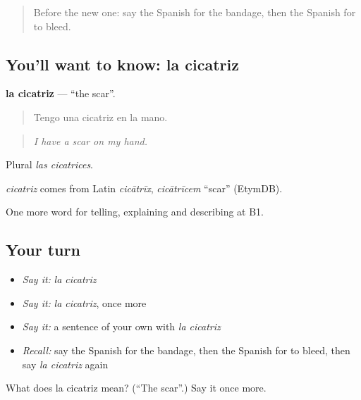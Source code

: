 \label{lesson:ES-C734-cicatriz}



\begin{quote}
Before the new one: say the Spanish for the bandage, then the Spanish for to bleed.
\end{quote}

\subsection*{You'll want to know: la cicatriz}
\textbf{la cicatriz} — \textquotedblleft{}the scar\textquotedblright{}.

\begin{quote}
Tengo una cicatriz en la mano.
\end{quote}

\begin{quote}
\emph{I have a scar on my hand.}
\end{quote}

Plural \emph{las cicatrices}.

\begin{cousinweb}
\emph{cicatriz} comes from Latin \emph{cicātrīx}, \emph{cicātrīcem} \textquotedblleft{}scar\textquotedblright{} (EtymDB).
\end{cousinweb}

\begin{grammarlens}[title={What you've built}]
One more word for telling, explaining and describing at B1.
\end{grammarlens}

\subsection*{Your turn}
\begin{itemize}
\raggedright
  \item \emph{Say it:} \emph{la cicatriz}
  \item \emph{Say it:} \emph{la cicatriz}, once more
  \item \emph{Say it:} a sentence of your own with \emph{la cicatriz}
  \item \emph{Recall:} say the Spanish for the bandage, then the Spanish for to bleed, then say \emph{la cicatriz} again
\end{itemize}

\begin{tcolorbox}[breakable,colback=teal!4,colframe=teal!35!black,title={Before you move on}]
What does la cicatriz mean? (\textquotedblleft{}The scar\textquotedblright{}.) Say it once more.
\end{tcolorbox}
